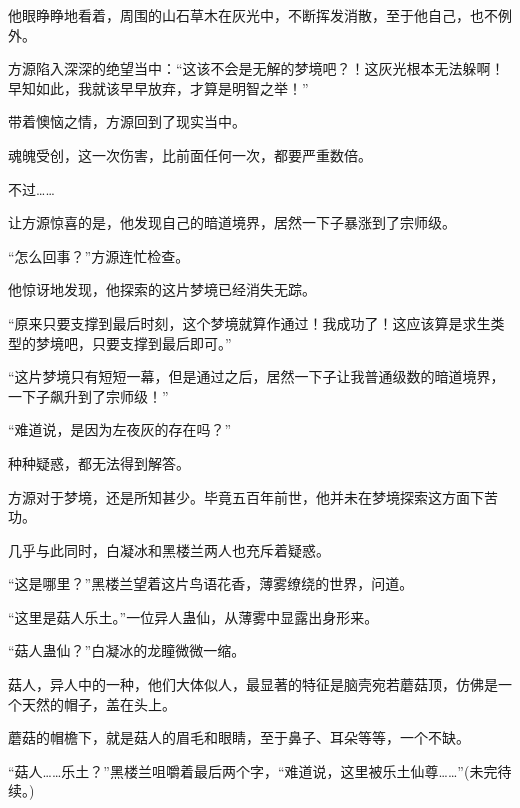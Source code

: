 \begin{this_body}
他眼睁睁地看着，周围的山石草木在灰光中，不断挥发消散，至于他自己，也不例外。

方源陷入深深的绝望当中：“这该不会是无解的梦境吧？！这灰光根本无法躲啊！早知如此，我就该早早放弃，才算是明智之举！”

带着懊恼之情，方源回到了现实当中。

魂魄受创，这一次伤害，比前面任何一次，都要严重数倍。

不过……

让方源惊喜的是，他发现自己的暗道境界，居然一下子暴涨到了宗师级。

“怎么回事？”方源连忙检查。

他惊讶地发现，他探索的这片梦境已经消失无踪。

“原来只要支撑到最后时刻，这个梦境就算作通过！我成功了！这应该算是求生类型的梦境吧，只要支撑到最后即可。”

“这片梦境只有短短一幕，但是通过之后，居然一下子让我普通级数的暗道境界，一下子飙升到了宗师级！”

“难道说，是因为左夜灰的存在吗？”

种种疑惑，都无法得到解答。

方源对于梦境，还是所知甚少。毕竟五百年前世，他并未在梦境探索这方面下苦功。

几乎与此同时，白凝冰和黑楼兰两人也充斥着疑惑。

“这是哪里？”黑楼兰望着这片鸟语花香，薄雾缭绕的世界，问道。

“这里是菇人乐土。”一位异人蛊仙，从薄雾中显露出身形来。

“菇人蛊仙？”白凝冰的龙瞳微微一缩。

菇人，异人中的一种，他们大体似人，最显著的特征是脑壳宛若蘑菇顶，仿佛是一个天然的帽子，盖在头上。

蘑菇的帽檐下，就是菇人的眉毛和眼睛，至于鼻子、耳朵等等，一个不缺。

“菇人……乐土？”黑楼兰咀嚼着最后两个字，“难道说，这里被乐土仙尊……”(未完待续。)

\end{this_body}

